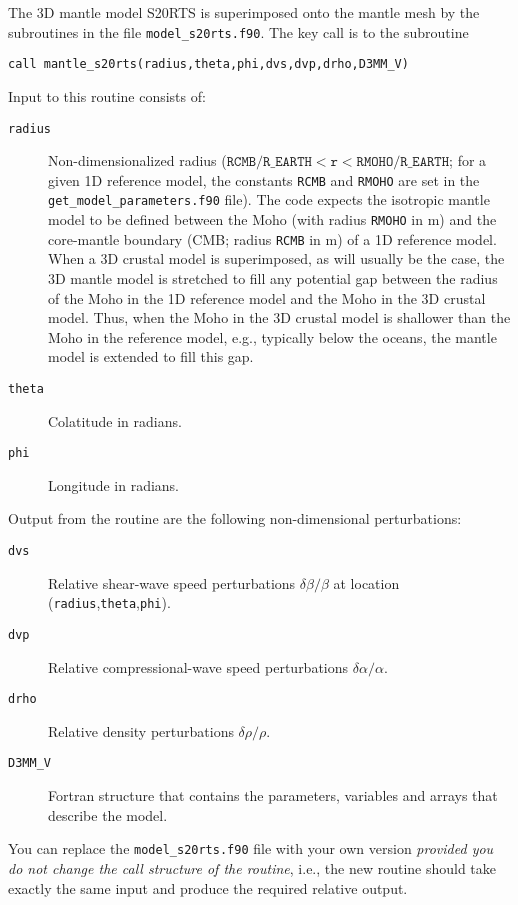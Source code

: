 The 3D mantle model S20RTS \citep{RiVaWo99} is superimposed onto
the mantle mesh by the subroutines in the file \texttt{model\_s20rts.f90}. The
key call is to the subroutine
\begin{verbatim}
call mantle_s20rts(radius,theta,phi,dvs,dvp,drho,D3MM_V)
\end{verbatim}

\noindent
Input to this routine consists of:
\begin{description}
\item [{\texttt{radius}}] Non-dimensionalized radius ($\texttt{RCMB/R\_ EARTH}<\texttt{r}<\texttt{RMOHO/R\_ EARTH}$;
for a given 1D reference model, the constants \texttt{RCMB} and \texttt{RMOHO}
are set in the \texttt{\small get\_model\_parameters}\texttt{.f90}
file). The code expects the isotropic mantle model to be defined between
the Moho (with radius \texttt{RMOHO} in m) and the core-mantle boundary
(CMB; radius \texttt{RCMB} in m) of a 1D reference model. When a 3D
crustal model is superimposed, as will usually be the case, the 3D
mantle model is stretched to fill any potential gap between the radius
of the Moho in the 1D reference model and the Moho in the 3D crustal
model. Thus, when the Moho in the 3D crustal model is shallower than
the Moho in the reference model, e.g., typically below the oceans,
the mantle model is extended to fill this gap.
\item [{\texttt{theta}}] Colatitude in radians.
\item [{\texttt{phi}}] Longitude in radians.
\end{description}
%
Output from the routine are the following non-dimensional perturbations:
\begin{description}
\item [{\texttt{dvs}}] Relative shear-wave speed perturbations $\delta\beta/\beta$
at location (\texttt{radius},\texttt{theta},\texttt{phi}).
\item [{\texttt{dvp}}] Relative compressional-wave speed perturbations
$\delta\alpha/\alpha$.
\item [{\texttt{drho}}] Relative density perturbations $\delta\rho/\rho$.
\item [{\texttt{D3MM\_V}}] Fortran structure that contains the parameters,
variables and arrays that describe the model.
\end{description}
You can replace the \texttt{model\_s20rts.f90} file with your own
version \textit{provided you do not change the call structure of the
routine}, i.e., the new routine should take exactly the same input
and produce the required relative output.\newline


